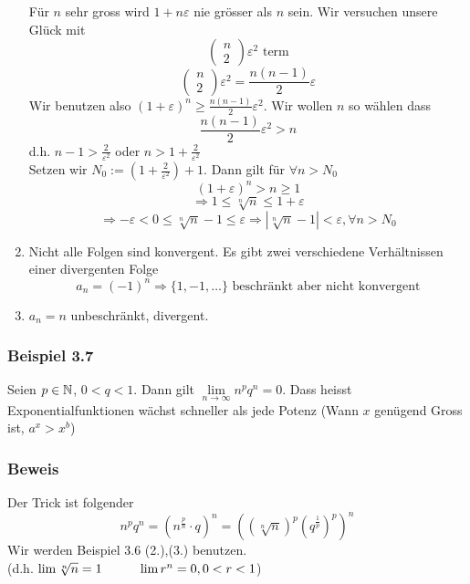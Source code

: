 \begin{enumerate}
Für $n$ sehr gross wird $1+n\varepsilon$ nie grösser als $n$ sein. Wir versuchen unsere Glück mit \[\left( {\begin{array}{*{20}{c}}
n\\
2
\end{array}} \right){\varepsilon ^2}{\text{ term}}\] 
\[\left( {\begin{array}{*{20}{c}}
n\\
2
\end{array}} \right){\varepsilon ^2} = \frac{{n(n - 1)}}{2}\varepsilon \] Wir benutzen also $( 1+\varepsilon )^n\geq \frac{n(n-1)}{2}\varepsilon^2$. Wir wollen $n$ so wählen dass \[\frac{{n(n - 1)}}{2}{\varepsilon ^2} > n\] d.h. $n-1>\frac{2}{\varepsilon^2}$ oder $n>1+\frac{2}{\varepsilon^2}$\\

Setzen wir $N_0:=\left( 1+\frac{2}{\varepsilon^2}\right)+1$. Dann gilt für $\forall n>N_0$ \[(1+\varepsilon)^n > n \geq 1\]
\[\Rightarrow 1\leq \sqrt[n]{n}\leq 1+\varepsilon\]
\[\Rightarrow -\varepsilon<0\leq\sqrt[n]{n}-1\leq\varepsilon\Rightarrow \left| \sqrt[n]{n}-1\right| <\varepsilon, \forall n>N_0\]
\item Nicht alle Folgen sind konvergent. Es gibt zwei verschiedene Verhältnissen einer divergenten Folge \[a_n=(-1)^n \Rightarrow \{1,-1,\dots \}\text{ beschränkt aber nicht konvergent}\]
\item $a_n=n$ unbeschränkt, divergent.
\end{enumerate}

\subsubsection*{Beispiel 3.7}
Seien $p\in\mathbb{N}$, $0<q<1$. Dann gilt $\lim\limits_{n\to\infty}n^p q^n=0$. Dass heisst Exponentialfunktionen wächst schneller als jede Potenz (Wann $x$ genügend Gross ist, $a^x>x^b$)

\subsubsection*{Beweis}
Der Trick ist folgender \[{n^p}{q^n} = {\left( {{n^{\frac{p}{n}}} \cdot q} \right)^n} = {\left( {{{\left( {\sqrt[n]{n}} \right)}^p}{{\left( {{q^{\frac{1}{p}}}} \right)}^p}} \right)^n}\] Wir werden Beispiel 3.6 (2.),(3.) benutzen. \\(d.h. $\lim\sqrt[n]{n}=1 \hspace{10mm}\lim r^n=0, 0<r<1$) \\

